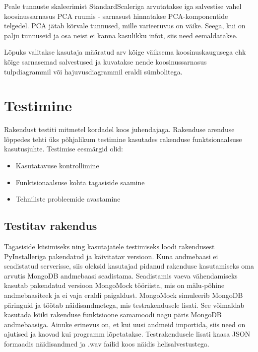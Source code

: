 Peale tunnuste skaleerimist StandardScaleriga arvutatakse iga salvestise vahel koosinussarnasus PCA ruumis - sarnasust hinnatakse PCA-komponentide telgedel. PCA jätab kõrvale tunnused, mille varieeruvus on väike. Seega, kui on palju tunnuseid ja osa neist ei kanna kasulikku infot, siis need eemaldatakse.

Lõpuks valitakse kasutaja määratud arv kõige väiksema koosinuskaugusega ehk kõige sarnasemad salvestused ja kuvatakse nende koosinussarnasus tulpdiagrammil või hajuvusdiagrammil eraldi sümbolitega.

\section{Testimine}
Rakendust testiti mitmetel kordadel koos juhendajaga. Rakenduse arenduse lõppedes tehti üks põhjalikum testimine kasutades rakenduse funktsionaalsuse kasutusjuhte.
Testimise eesmärgid olid:
\begin{itemize}
    \item Kasutatavuse kontrollimine
    \item Funktsionaalsuse kohta tagasiside saamine
    \item Tehniliste probleemide avastamine
\end{itemize}

\subsection{Testitav rakendus}
Tagasiside küsimiseks ning kasutajatele testimiseks loodi rakendusest PyInstalleriga \cite{pyinstaller_manual} pakendatud ja käivitatav versioon. Kuna andmebaasi ei seadistatud serverisse, siis oleksid kasutajad pidanud rakenduse kasutamiseks oma arvutis MongoDB andmebaasi seadistama. Seadistamis vaeva vähendamiseks kasutab pakendatud versioon MongoMock \cite{mongomock} tööriista, mis on mälu-põhine andmebaasiteek ja ei vaja eraldi paigaldust. MongoMock simuleerib MongoDB päringuid ja töötab näidisandmetega, mis testrakendusele lisati. See võimaldab kasutada kõiki rakenduse funktsioone samamoodi nagu päris MongoDB andmebaasiga. Ainuke erinevus on, et kui uusi andmeid importida, siis need on ajutised ja kaovad kui programm lõpetatakse. Testrakendusele lisati kaasa JSON formaadis näidisandmed ja .wav failid koos näidis helisalvestustega.
